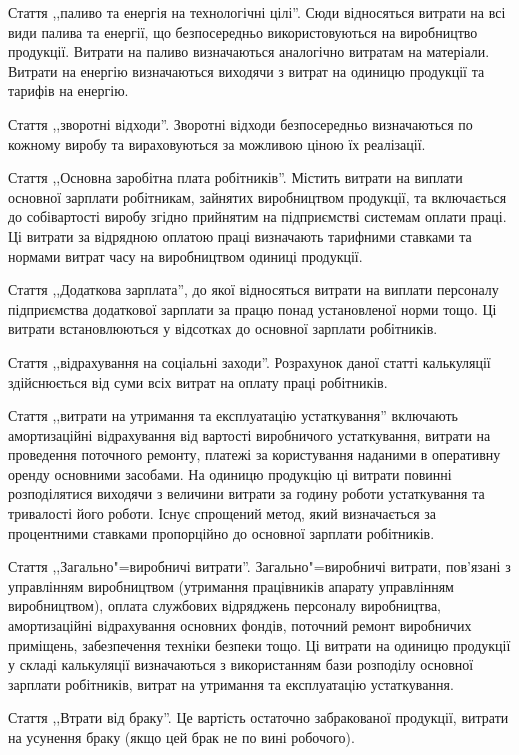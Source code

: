 \documentclass[a5paper,10pt,notitlepage,pdftex,headsepline]{scrartcl}
\begin{document}
  Стаття ,,паливо та енергія на технологічні цілі''.
  Сюди відносяться витрати на всі види палива та енергії, що безпосередньо
  використовуються на виробництво продукції.
  Витрати на паливо визначаються аналогічно витратам на матеріали.
  Витрати на енергію визначаються виходячи з витрат на одиницю продукції та
  тарифів на енергію.

  Стаття ,,зворотні відходи''.
  Зворотні відходи безпосередньо визначаються по кожному виробу та
  вираховуються за можливою ціною їх реалізації.

  Стаття ,,Основна заробітна плата робітників''.
  Містить витрати на виплати основної зарплати робітникам, зайнятих
  виробництвом продукції, та включається до собівартості виробу згідно
  прийнятим на підприємстві системам оплати праці.
  Ці витрати за відрядною оплатою праці визначають тарифними ставками та
  нормами витрат часу на виробництвом одиниці продукції.

  Стаття ,,Додаткова зарплата'', до якої відносяться витрати на виплати
  персоналу підприємства додаткової зарплати за працю понад установленої
  норми тощо.
  Ці витрати встановлюються у відсотках до основної зарплати робітників.

  Стаття ,,відрахування на соціальні заходи''.
  Розрахунок даної статті калькуляції здійснюється від суми всіх витрат на
  оплату праці робітників.

  Стаття ,,витрати на утримання та експлуатацію устаткування'' включають
  амортизаційні відрахування від вартості виробничого устаткування, витрати на
  проведення поточного ремонту, платежі за користування наданими в оперативну
  оренду основними засобами.
  На одиницю продукцію ці витрати повинні розподілятися виходячи з величини
  витрати за годину роботи устаткування та тривалості його роботи.
  Існує спрощений метод, який визначається за процентними ставками пропорційно
  до основної зарплати робітників.

  Стаття ,,Загально"=виробничі витрати''.
  Загально"=виробничі витрати, пов’язані з управлінням виробництвом (утримання
  працівників апарату управлінням виробництвом), оплата службових відряджень
  персоналу виробництва, амортизаційні відрахування основних фондів, поточний
  ремонт виробничих приміщень, забезпечення техніки безпеки тощо.
  Ці витрати на одиницю продукції у складі калькуляції визначаються з
  використанням бази розподілу основної зарплати робітників, витрат на
  утримання та експлуатацію устаткування.

  Стаття ,,Втрати від браку''.
  Це вартість остаточно забракованої продукції, витрати на усунення браку
  (якщо цей брак не по вині робочого).
\end{document}
